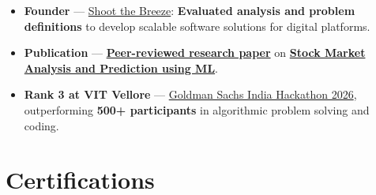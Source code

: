 \documentclass[a4paper,11pt]{article}
\newcommand{\ulink}[2]{\href{#1}{#2}}
\begin{document}
\begin{itemize}[nosep, leftmargin=1.5em, itemsep=2pt, topsep=2pt]
  \item {\color[HTML]{0A0A0A}\fontsize{11}{14}\selectfont \textbf{Founder} --- \ulink{https://shoot-the-breeze.vercel.app}{Shoot the Breeze}: \textbf{Evaluated analysis and problem definitions} to develop scalable software solutions for digital platforms.}
  \item {\color[HTML]{0A0A0A}\fontsize{11}{14}\selectfont \textbf{Publication} --- \ulink{https://www.elruha.org/_files/ugd/614b1f_6b95e1b697bf452b9907ba46e0151c05.pdf\#page=774}{\textbf{Peer-reviewed research paper}} on \ulink{https://github.com/su-jin1425/Set-Project}{\textbf{Stock Market Analysis and Prediction using ML}}.}
  \item {\color[HTML]{0A0A0A}\fontsize{11}{14}\selectfont \textbf{Rank 3 at VIT Vellore} --- \ulink{https://www.hackerrank.com/contests/goldman-sachs-india-hackathon-2026-cs/leaderboard}{Goldman Sachs India Hackathon 2026}, outperforming \textbf{500+ participants} in algorithmic problem solving and coding.}
\end{itemize}

\section{Certifications}
\vspace{2pt}
\end{document}

